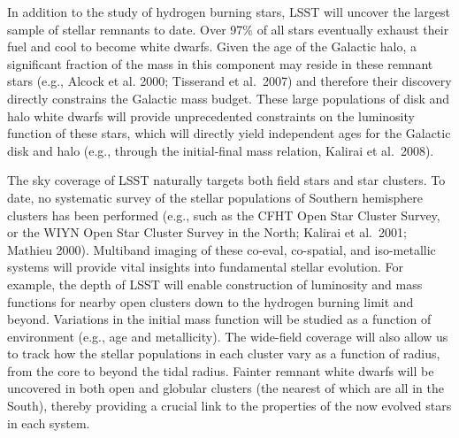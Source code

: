 \documentclass{emulateapj}
\begin{document}

In addition to the study of hydrogen burning stars, LSST will uncover the largest sample of stellar remnants to date. 
Over 97\% of all stars eventually exhaust their fuel and cool to become white dwarfs. Given the age of the Galactic 
halo, a significant fraction of the mass in this component may reside in these remnant stars (e.g., Alcock et al.
2000; Tisserand et al.~2007) and therefore their discovery directly constrains the Galactic mass budget.  These large 
populations of disk and halo white dwarfs will provide unprecedented constraints on the luminosity function of
these stars, which will directly yield independent ages for the Galactic disk and halo (e.g., through the initial-final mass
relation, Kalirai et al.~2008).

The sky coverage of LSST naturally targets both field stars and star clusters.  To date, no systematic survey of the stellar 
populations of Southern hemisphere clusters has been performed (e.g., such as the CFHT Open Star Cluster Survey, or 
the WIYN Open Star Cluster Survey in the North; Kalirai et al.~2001; Mathieu 2000).  Multiband imaging of these co-eval, 
co-spatial, and iso-metallic systems will provide vital insights into fundamental stellar evolution.  For example, the depth 
of LSST will enable construction of  luminosity and mass functions for nearby open clusters down to the hydrogen burning
limit and beyond.  Variations in the initial mass function will be studied as a function of environment (e.g., age and metallicity).  
The wide-field coverage will also allow us to track how the stellar populations in each cluster vary as a function of radius, 
from the core to beyond the tidal radius. Fainter remnant white dwarfs will be uncovered in both open and globular clusters
(the nearest of which are all in the South), thereby providing a crucial link to the properties of the now evolved stars in each 
system.
\end{document}
